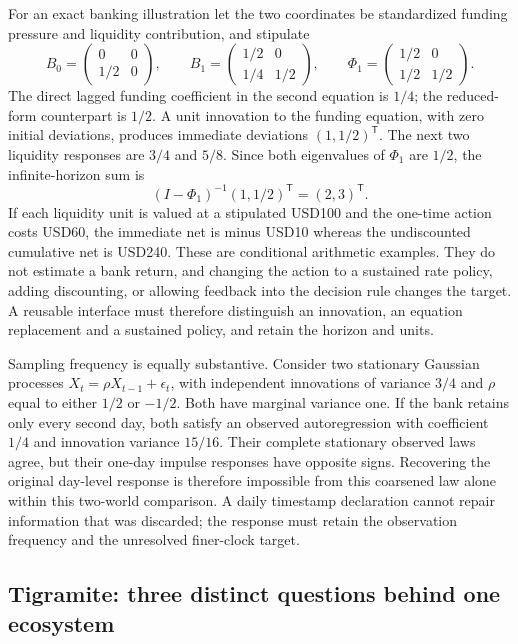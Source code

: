 For an exact banking illustration let the two coordinates be standardized
funding pressure and liquidity contribution, and stipulate
\[
 B_0=\begin{pmatrix}0&0\\1/2&0\end{pmatrix},\qquad
 B_1=\begin{pmatrix}1/2&0\\1/4&1/2\end{pmatrix},\qquad
 \Phi_1=\begin{pmatrix}1/2&0\\1/2&1/2\end{pmatrix}.
\]
The direct lagged funding coefficient in the second equation is $1/4$;
the reduced-form counterpart is $1/2$. A unit innovation to the funding
equation, with zero initial deviations, produces immediate deviations
$(1,1/2)^\mathsf{T}$. The next two liquidity responses are $3/4$ and $5/8$.
Since both eigenvalues of $\Phi_1$ are $1/2$, the infinite-horizon sum is
\[
 (I-\Phi_1)^{-1}(1,1/2)^\mathsf{T}=(2,3)^\mathsf{T}.
\]
If each liquidity unit is valued at a stipulated USD100 and the one-time
action costs USD60, the immediate net is minus USD10 whereas the undiscounted
cumulative net is USD240. These are conditional arithmetic examples. They
do not estimate a bank return, and changing the action to a sustained rate
policy, adding discounting, or allowing feedback into the decision rule
changes the target. A reusable interface must therefore distinguish an
innovation, an equation replacement and a sustained policy, and retain the
horizon and units.\citep{exec14_pt_exact}

Sampling frequency is equally substantive. Consider two stationary Gaussian
processes $X_t=\rho X_{t-1}+\epsilon_t$, with independent innovations of
variance $3/4$ and $\rho$ equal to either $1/2$ or $-1/2$. Both have marginal
variance one. If the bank retains only every second day, both satisfy an
observed autoregression with coefficient $1/4$ and innovation variance
$15/16$. Their complete stationary observed laws agree, but their one-day
impulse responses have opposite signs. Recovering the original day-level
response is therefore impossible from this coarsened law alone within this
two-world comparison. A daily timestamp declaration cannot repair information
that was discarded; the response must retain the observation frequency and
the unresolved finer-clock target.\citep{exec14_pt_exact}

\subsection{Tigramite: three distinct questions behind one ecosystem}


